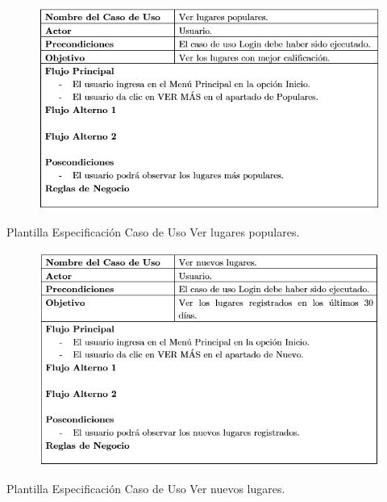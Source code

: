 \documentclass[12pt,letterpaper,openany]{book}
\begin{document}
\begin{table}[H]
\begin{center}
\begin{figure}[H]
\begin{center}
\includegraphics[width=13cm]{./imagenes/PCU/ver_lugares_populares}
\end{center}
\end{figure}
\end{center}
\caption{Plantilla Especificación Caso de Uso Ver lugares populares.}
\end{table}

\begin{table}[H]
\begin{center}
\begin{figure}[H]
\begin{center}
\includegraphics[width=13cm]{./imagenes/PCU/ver_nuevos_lugares}
\end{center}
\end{figure}
\end{center}
\caption{Plantilla Especificación Caso de Uso Ver nuevos lugares.}
\end{table}
\end{document}
